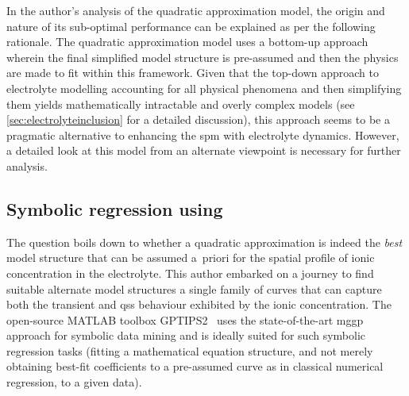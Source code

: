 

In the  author's analysis of the  quadratic approximation model, the  origin and
nature of  its sub-optimal  performance can  be explained  as per  the following
rationale. The quadratic  approximation model uses a  bottom-up approach wherein
the final  simplified model structure  is pre-assumed  and then the  physics are
made  to  fit  within  this  framework. Given  that  the  top-down  approach  to
electrolyte  modelling \ie{}  accounting for  all physical  phenomena and  then
simplifying  them yields  mathematically intractable  and overly  complex models
(see \cref{sec:electrolyteinclusion} for  a detailed discussion),  this approach
seems to be a pragmatic alternative  to enhancing the \gls{spm} with electrolyte
dynamics. However, a detailed look at  this model from an alternate viewpoint is
necessary for further analysis.


\subsection{Symbolic regression using }\label{subsec:symbolicreg}

The  question boils  down to  whether a  quadratic approximation  is indeed  the
\emph{best}  model structure  that  can  be assumed  a~priori  for the  spatial
profile  of  ionic  concentration  in  the  electrolyte.  This  author  embarked
on  a journey  to  find  suitable alternate  model  structures \ie{} a  single
family of  curves that can  capture both  the transient and  \gls{qss} behaviour
exhibited by  the ionic  concentration. The open-source  \textsc{MATLAB} toolbox
GPTIPS2~\cite{Searson2015}  uses the  state-of-the-art  \gls{mggp} approach  for
symbolic data  mining and is ideally  suited for such symbolic  regression tasks
(fitting a  mathematical equation structure,  and not merely  obtaining best-fit
coefficients to a  pre-assumed curve as in classical numerical  regression, to a
given data).

